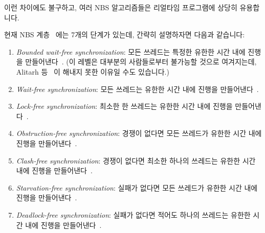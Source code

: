 이런 차이에도 불구하고, 여러 NBS 알고리즘들은 리얼타임 프로그램에 상당히
유용합니다.

현재 NBS 계층~\cite{DanAlitarh2013PracticalProgress} 에는 7개의 단계가 있는데,
간략히 설명하자면 다음과 같습니다:
\iffalse

Despite these differences, a number of NBS algorithms are extremely
useful in real-time programs.

There are currently seven levels in the NBS
hierarchy~\cite{DanAlitarh2013PracticalProgress}, which are roughly
as follows:
\fi

\begin{enumerate}
\item	\emph{Bounded wait-free synchronization}: 모든 쓰레드는 특정한 유한한
	시간 내에 진행을 만들어낸다~\cite{Herlihy91}.
	(이 레벨은 대부분의 사람들로부터 불가능할 것으로 여겨지는데, Alitarh
	등~\cite{DanAlitarh2013PracticalProgress} 이 해내지 못한 이유일 수도
	있습니다.)
\item	\emph{Wait-free synchronization}: 모든 쓰레드는 유한한 시간 내에 진행을
	만들어낸다~\cite{Herlihy93}.
\item	\emph{Lock-free synchronization}: 최소한 한 쓰레드는 유한한 시간 내에
	진행을 만들어낸다~\cite{Herlihy93}.
\item	\emph{Obstruction-free synchronization}: 경쟁이 없다면 모든 쓰레드가
	유한한 시간 내에 진행을 만들어낸다~\cite{HerlihyLM03}.
\item	\emph{Clash-free synchronization}: 경쟁이 없다면 최소한 하나의 쓰레드는
	유한한 시간 내에 진행을
	만들어낸다~\cite{DanAlitarh2013PracticalProgress}.
\item	\emph{Starvation-free synchronization}: 실패가 없다면 모든 쓰레드가
	유한한 시간 내에 진행을
	만들어낸다~\cite{DanAlitarh2013PracticalProgress}.
\item	\emph{Deadlock-free synchronization}: 실패가 없다면 적어도 하나의
	쓰레드는 유한한 시간 내에 진행을
	만들어낸다~\cite{DanAlitarh2013PracticalProgress}.
\end{enumerate}
\iffalse

